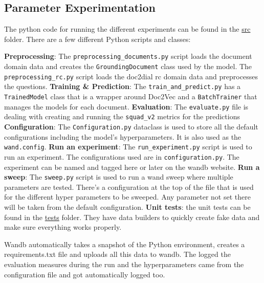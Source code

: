 \documentclass[11pt]{article}
\begin{document}
    \subsection{Parameter Experimentation}\label{subsec:experimentation-experiment}
    The python code for running the different experiments can be found in the \href{https://github.com/isabelladegen/nlp-2021/tree/main/src}{src}
    folder. There are a few different Python scripts and classes:
    \begin{outline}
        \1 \textbf{Preprocessing}: The \texttt{preprocessing\_documents.py} script loads the document domain data and creates the
        \texttt{GroundingDocument} class used by the model. The \texttt{preprocessing\_rc.py} script loads the doc2dial rc
        domain data and preprocesses the questions.
        \1 \textbf{Training \& Prediction}: The \texttt{train\_and\_predict.py} has a \texttt{TrainedModel} class that is a wrapper around
        Doc2Vec and a \texttt{BatchTrainer} that manages the models for each document.
        \1 \textbf{Evaluation}: The \texttt{evaluate.py} file is dealing with creating and running the \texttt{squad\_v2} metrics for the predictions
        \1 \textbf{Configuration}: The \texttt{Configuration.py} dataclass is used to store all the default configurations including
        the model's hyperparameters. It is also used as the \texttt{wand.config}.
        \1 \textbf{Run an experiment}: The \texttt{run\_experiment.py} script is used to run an experiment.
        The configurations used are in \texttt{configuration.py}.
        The experiment can be named and tagged here or later on the wandb website.
        \1 \textbf{Run a sweep}: The \texttt{sweep.py} script is used to run a wand sweep where multiple parameters are tested.
        There's a configuration at the top of the file that is used for the different hyper parameters to be sweeped.
        Any parameter not set there will be taken from the default configuration.
        \1 \textbf{Unit tests}: the unit tests can be found in the \href{https://github.com/isabelladegen/nlp-2021/tree/main/tests}{tests}
        folder. They have data builders to quickly create fake data and make sure everything works properly.
    \end{outline}

    Wandb automatically takes a snapshot of the Python environment, creates a requirements.txt file and uploads all this
    data to wandb. The logged the evaluation measures during the run and the hyperparameters came from the configuration
    file and got automatically logged too.
\end{document}
